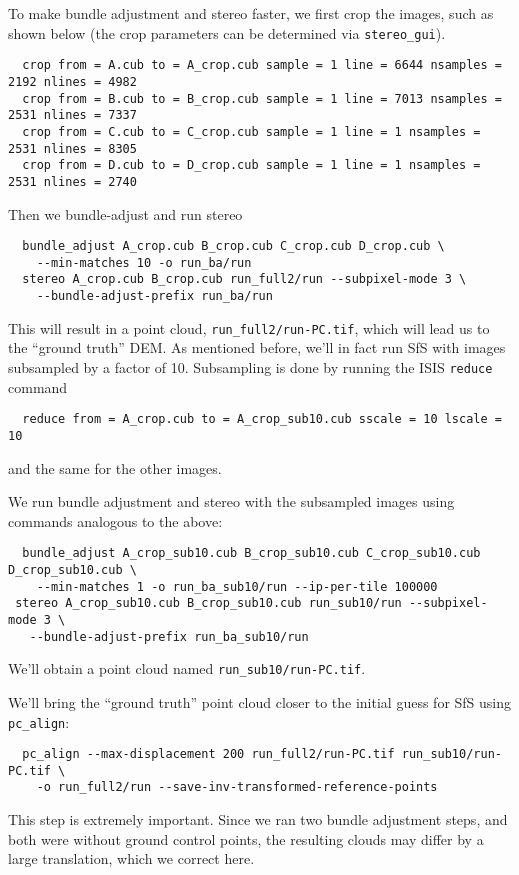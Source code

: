 To make bundle adjustment and stereo faster, we first crop the images,
such as shown below (the crop parameters can be determined via
\texttt{stereo\_gui}).
\begin{verbatim}
  crop from = A.cub to = A_crop.cub sample = 1 line = 6644 nsamples = 2192 nlines = 4982
  crop from = B.cub to = B_crop.cub sample = 1 line = 7013 nsamples = 2531 nlines = 7337
  crop from = C.cub to = C_crop.cub sample = 1 line = 1 nsamples = 2531 nlines = 8305
  crop from = D.cub to = D_crop.cub sample = 1 line = 1 nsamples = 2531 nlines = 2740
\end{verbatim}
Then we bundle-adjust and run stereo
\begin{verbatim}
  bundle_adjust A_crop.cub B_crop.cub C_crop.cub D_crop.cub \
    --min-matches 10 -o run_ba/run
  stereo A_crop.cub B_crop.cub run_full2/run --subpixel-mode 3 \
    --bundle-adjust-prefix run_ba/run
\end{verbatim}

This will result in a point cloud, \verb#run_full2/run-PC.tif#, which will
lead us to the ``ground truth'' DEM. As mentioned
before, we'll in fact run SfS with images subsampled by a factor of
10. Subsampling is done by running the ISIS \texttt{reduce} command
\begin{verbatim}
  reduce from = A_crop.cub to = A_crop_sub10.cub sscale = 10 lscale = 10
\end{verbatim}
and the same for the other images.

We run bundle adjustment and stereo with the subsampled images using
commands analogous to the above:
\begin{verbatim}
  bundle_adjust A_crop_sub10.cub B_crop_sub10.cub C_crop_sub10.cub D_crop_sub10.cub \
    --min-matches 1 -o run_ba_sub10/run --ip-per-tile 100000
 stereo A_crop_sub10.cub B_crop_sub10.cub run_sub10/run --subpixel-mode 3 \
   --bundle-adjust-prefix run_ba_sub10/run
\end{verbatim}
We'll obtain a point cloud named \verb#run_sub10/run-PC.tif#.

We'll bring the ``ground truth'' point cloud closer to the initial guess
for SfS using \texttt{pc\_align}:
\begin{verbatim}
  pc_align --max-displacement 200 run_full2/run-PC.tif run_sub10/run-PC.tif \
    -o run_full2/run --save-inv-transformed-reference-points
\end{verbatim}
This step is extremely important. Since we ran two bundle adjustment
steps, and both were without ground control points, the resulting clouds
may differ by a large translation, which we correct here.

